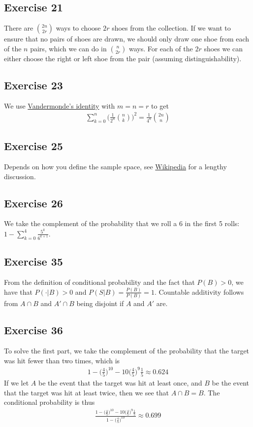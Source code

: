 \subsection{Exercise 21}
There are $\binom{2n}{2r}$ ways to choose $2r$ shoes from the collection. If we want to ensure that
no pairs of shoes are drawn, we should only draw one shoe from each of the $n$ pairs, which we can do
in $\binom{n}{2r}$ ways. For each of the $2r$ shoes we can either choose the right or left shoe from 
the pair (assuming distinguishability).

\subsection{Exercise 23}
We use \href{https://en.wikipedia.org/wiki/Vandermonde%27s_identity}{Vandermonde's identity} with $m = n = r$ to get
\begin{align*}
        \sum_{k = 0}^n \bigg(\frac{1}{2^n} \binom{n}{k} \bigg)^2 = \frac{1}{4^n} \binom{2n}{n}
\end{align*}

\subsection{Exercise 25}
Depends on how you define the sample space, see \href{https://en.wikipedia.org/wiki/Boy_or_Girl_paradox#Analysis_of_the_ambiguity}{Wikipedia} for a lengthy discussion.

\subsection{Exercise 26}
We take the complement of the probability that we roll a 6 in the first 5 rolls:
$1 - \sum_{k = 0}^{4} \frac{5^k}{6^{k+1}}$.

\subsection{Exercise 35}
From the definition of conditional probability and the fact that $P(B) > 0$,
we have that $P(\cdot | B) > 0$ and $P(S | B) = \frac{P(B)}{P(B)} = 1$. Countable additivity
follows from $A \cap B$ and $A' \cap B$ being disjoint if $A$ and $A'$ are.

\subsection{Exercise 36}
To solve the first part, we take the complement of the probability that the target was hit fewer than
two times, which is
\begin{align*}
        1 - \bigg(\frac{4}{5}\bigg)^{10} - 10\bigg(\frac{4}{5}\bigg)^9 \frac{1}{5} \approx 0.624
\end{align*}
If we let $A$ be the event that the target was hit at least once, and $B$ be the event that the target was
hit at least twice, then we see that $A \cap B = B$. The conditional probability is thus
\begin{align*}
        \frac{1 - \bigg(\frac{4}{5}\bigg)^{10} - 10\bigg(\frac{4}{5}\bigg)^9 \frac{1}{5}}{1 - \bigg(\frac{4}{5}\bigg)^{10}} \approx 0.699
\end{align*}
